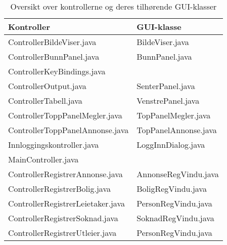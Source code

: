 \begin{table}[ht]
\center
\caption{Oversikt over kontrollerne og deres tilhørende GUI-klasser}
\label{tab:kontrollerguikobling}
\begin{tabular}{|l|l|}

\hline
Kontroller						& GUI-klasse \\ \hline

ControllerBildeViser.java		& BildeViser.java \\
ControllerBunnPanel.java			& BunnPanel.java \\
ControllerKeyBindings.java		& \\
ControllerOutput.java			& SenterPanel.java \\
ControllerTabell.java			& VenstrePanel.java \\
ControllerToppPanelMegler.java	& TopPanelMegler.java \\
ControllerToppPanelAnnonse.java  & TopPanelAnnonse.java \\
Innloggingskontroller.java		& LoggInnDialog.java \\
MainController.java				& \\
ControllerRegistrerAnnonse.java  & AnnonseRegVindu.java \\
ControllerRegistrerBolig.java 	& BoligRegVindu.java \\
ControllerRegistrerLeietaker.java 	& PersonRegVindu.java \\
ControllerRegistrerSoknad.java 	& SoknadRegVindu.java \\
ControllerRegistrerUtleier.java 	& PersonRegVindu.java \\


\hline
\end{tabular}
\end{table}